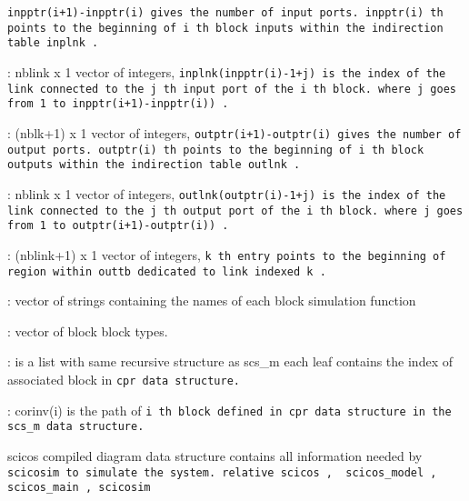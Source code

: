 \begin{scitem}
\begin{scitem}
\tt inpptr(i+1)-inpptr(i) %
\rm gives
the number of input ports. %
\tt inpptr(i)%
\rm th points to the
beginning of %
\tt i%
\rm th block inputs  within the indirection table %
\tt inplnk%
\rm .
\item[{\verb?sim('inplnk')?}]
: nblink x 1 vector of integers, %
\tt inplnk(inpptr(i)-1+j) %
\rm is the
index of the link connected to the  %
\tt j%
\rm th input port of the %
\tt i%
\rm th block.
where %
\tt j %
\rm goes from %
\tt 1 %
\rm to %
\tt inpptr(i+1)-inpptr(i))%
\rm .
\item[{\verb?sim('outptr')?}]
: (nblk+1) x 1 vector of integers, %
\tt outptr(i+1)-outptr(i) %
\rm gives
the number of output ports. %
\tt outptr(i)%
\rm th points to the
beginning of %
\tt i%
\rm th block outputs  within the indirection table %
\tt outlnk%
\rm .
\item[{\verb?sim('outlnk')?}]
: nblink x 1 vector of integers, %
\tt outlnk(outptr(i)-1+j) %
\rm is the
index of the link connected to the  %
\tt j%
\rm th output port of the %
\tt i%
\rm th block.
where %
\tt j %
\rm goes from %
\tt 1 %
\rm to %
\tt outptr(i+1)-outptr(i))%
\rm .
\item[{\verb?sim('lnkptr')?}]
: (nblink+1) x 1 vector of integers, %
\tt k%
\rm th  entry points to the
beginning of region  within %
\tt outtb %
\rm dedicated to link indexed %
\tt k%
\rm .
\item[{\verb?sim('funs')?}]
: vector of strings containing the names of each block simulation function
\item[{\verb?sim('funtyp')?}]
: vector of  block block types.
\end{scitem}
\item[{\verb?cor    ?}]
: is a list with same recursive structure as scs\_m each leaf 
contains the index of associated block in %
\tt cpr %
\rm data structure.
\item[{\verb?corinv ?}]
: corinv(i) is the path of %
\tt i %
\rm th block defined in %
\tt cpr %
\rm data structure
          in the %
\tt scs\_m %
\rm data structure.

\end{scitem}%
scicos compiled diagram data structure contains all information needed
by %
\tt scicosim %
\rm to simulate the system. relative
{\verb?scicos?} \pageref{scicos},{\verb?  scicos_model?} \pageref{scicosmodel},{\verb? scicos_main?} \pageref{scicosmain},{\verb? scicosim?} \pageref{scicosim}








